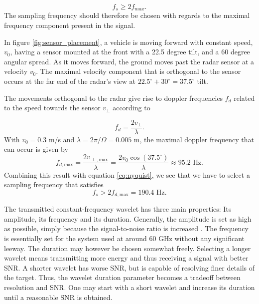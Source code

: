 \begin{equation}
\label{eq:nyquist}
		f_{s} \geq 2f_{max}.
\end{equation}
The sampling frequency should therefore be chosen with regards to the maximal frequency component present in the signal. 

In figure \ref{fig:sensor_placement}, a vehicle is moving forward with constant speed, $v_0$, having a sensor mounted at the front with a 22.5 degree tilt, and a 60 degree angular spread. As it moves forward, the ground moves past the radar sensor at a velocity $v_0$. The maximal velocity component that is orthogonal to the sensor occurs at the far end of the radar's view at $22.5^\circ + 30^\circ = 37.5^\circ$ tilt. 

The movements orthogonal to the radar give rise to doppler frequencies $f_d$ related to the speed towards the sensor $v_\perp$ according to \citep{lien_gillian_karagozler_amihood_schwesig_olson_raja_poupyrev_2016}

\begin{equation}
	f_{d} = \frac{2v_\perp}{\lambda}.
\end{equation}
With $v_0=0.3$ m/s and $\lambda = 2\pi/\Omega = 0.005$ m, the maximal doppler frequency that can occur is given by 
\begin{equation}
	f_{d,\textrm{max}} 
	=\frac{2 v_{\perp, \textrm{max}}}{\lambda} 
	= \frac{2 v_0\cos(37.5^\circ)}{\lambda}
	\approx 95.2 \text { Hz}.
\end{equation}
Combining this result with equation \eqref{eq:nyquist}, we see that we have to select  a sampling frequency that satisfies
\begin{equation}
	f_s > 2f_{d,\textrm{max}} = 190.4 \text{ Hz}.
\end{equation}

The transmitted constant-frequency wavelet has three main properties: Its amplitude, its frequency and its duration. Generally, the amplitude is set as high as possible, simply because the signal-to-noise ratio is increased \citep{richards_2014}. The frequency is essentially set for the system used at around 60 GHz without any significant leeway. The duration may however be chosen somewhat freely. Selecting a longer wavelet means transmitting more energy and thus receiving a signal with better SNR. A shorter wavelet has worse SNR, but is capable of resolving finer details of the target. Thus, the wavelet duration parameter becomes a tradeoff between resolution and SNR. One may start with a short wavelet and increase its duration until a reasonable SNR is obtained.  

